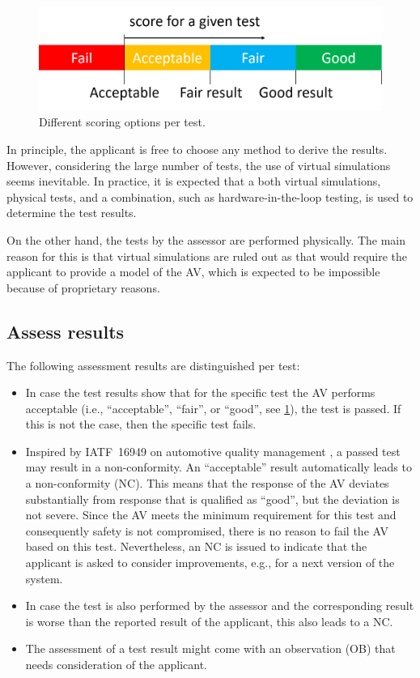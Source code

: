 \documentclass[twoside,twocolumn,9pt]{article}
\theoremstyle{plain}
\theoremstyle{remark}\newtheorem{remarkenv}{Remark}        %
\begin{document}
\begin{figure}
	\centering
	\includegraphics[width=\linewidth]{rating}
	\caption{Different scoring options per test.}
	\label{fig:rating}
\end{figure}

In principle, the applicant is free to choose any method to derive the results. However, considering the large number of tests, the use of virtual simulations seems inevitable. In practice, it is expected that a both virtual simulations, physical tests, and a combination, such as hardware-in-the-loop testing, is used to determine the test results.

On the other hand, the tests by the assessor are performed physically. The main reason for this is that virtual simulations are ruled out as that would require the applicant to provide a model of the AV, which is expected to be impossible because of proprietary reasons.



\subsection{Assess results}
\label{sec:assess results}

The following assessment results are distinguished per test:
\begin{itemize}
	\item In case the test results show that for the specific test the AV performs acceptable (i.e., ``acceptable'', ``fair'', or ``good'', see \cref{fig:rating}), the test is passed. If this is not the case, then the specific test fails.
	\item Inspired by IATF~16949 on automotive quality management \autocite{IATF16949}, a passed test may result in a non-conformity. An “acceptable” result automatically leads to a non-conformity (NC). This means that the response of the AV deviates substantially from  response that is qualified as “good”, but the deviation is not severe. Since the AV meets the minimum requirement for this test and consequently safety is not compromised, there is no reason to fail the AV based on this test. Nevertheless, an NC is issued to indicate that the applicant is asked to consider improvements, e.g., for a next version of the system.
	\item In case the test is also performed by the assessor and the corresponding result is worse than the reported result of the applicant, this also leads to a NC.
	\item The assessment of a test result might come with an observation (OB) that needs consideration of the applicant. 
\end{itemize}
\end{document}
